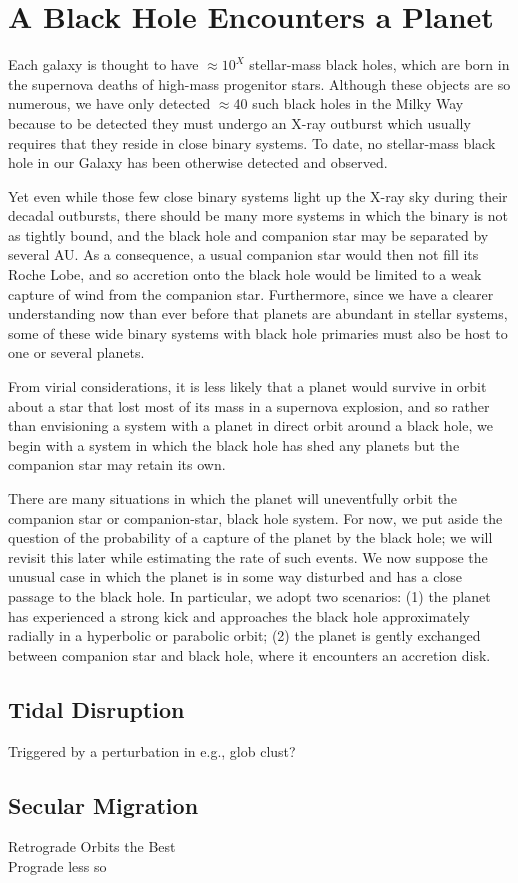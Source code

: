 \section{A Black Hole Encounters a Planet}\label{section:general}


Each galaxy is thought to have $\approx 10^X$ stellar-mass black
holes, which are born in the supernova deaths of high-mass progenitor
stars.  Although these objects are so numerous, we have only detected
$\approx$40 such black holes in the Milky Way because to be detected
they must undergo an X-ray outburst which usually requires that they
reside in close binary systems.  To date, no stellar-mass black hole
in our Galaxy has been otherwise detected and observed.


Yet even while those few close binary systems light up the X-ray sky
during their decadal outbursts, there should be many more systems in
which the binary is not as tightly bound, and the black hole and
companion star may be separated by several AU.  As a consequence, a
usual companion star would then not fill its Roche Lobe, and so
accretion onto the black hole would be limited to a weak capture of
wind from the companion star.  Furthermore, since we have a clearer
understanding now than ever before that planets are abundant in
stellar systems, some of these wide binary systems with black hole
primaries must also be host to one or several planets.  


From virial considerations, it is less likely that a planet would
survive in orbit about a star that lost most of its mass in a
supernova explosion, and so rather than envisioning a system with a
planet in direct orbit around a black hole, we begin with a system in
which the black hole has shed any planets but the companion star may
retain its own.


There are many situations in which the planet will uneventfully orbit
the companion star or companion-star, black hole system.  For now, we
put aside the question of the probability of a capture of the planet
by the black hole; we will revisit this later while estimating the
rate of such events.  We now suppose the unusual case in which the
planet is in some way disturbed and has a close passage to the black
hole.  In particular, we adopt two scenarios: (1) the planet has
experienced a strong kick and approaches the black hole approximately
radially in a hyperbolic or parabolic orbit; (2) the planet is gently
exchanged between companion star and black hole, where it encounters
an accretion disk.


\subsection{Tidal Disruption}
Triggered by a perturbation in e.g., glob clust?


\subsection{Secular Migration}
Retrograde Orbits the Best\\
Prograde less so
